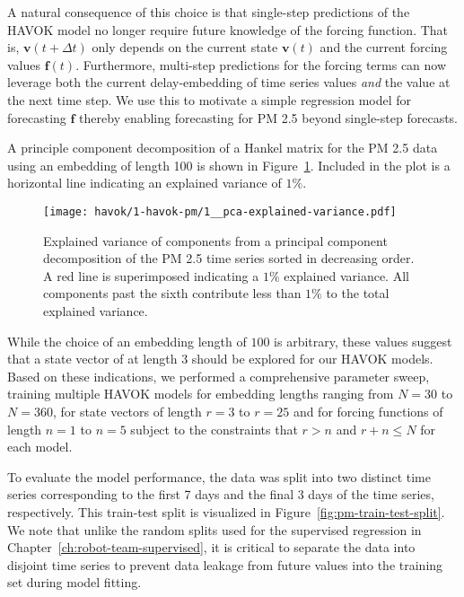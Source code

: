 A natural consequence of this choice is that single-step predictions of the
HAVOK model no longer require future knowledge of the forcing function. That is,
$\mathbf{v}(t+\Delta t)$ only depends on the current state $\mathbf{v}(t)$ and
the current forcing values $\mathbf{f}(t)$. Furthermore, multi-step
predictions for the forcing terms can now leverage both the current delay-embedding of
time series values \textit{and} the value at the next time step. We use this to
motivate a simple regression model for forecasting $\mathbf{f}$ thereby enabling
forecasting for PM 2.5 beyond single-step forecasts.

A principle component decomposition of a Hankel matrix for the PM 2.5 data 
using an embedding of length 100 is shown in Figure~\ref{fig:pm-timeseries-pca}.
Included in the plot is a horizontal line indicating an explained variance of
$1\%$.

\begin{figure}[h]
  \centering
  \texttt{[image: havok/1-havok-pm/1\_\_pca-explained-variance.pdf]}
  \caption{Explained variance of components from a principal component
    decomposition of the PM 2.5 time series sorted in decreasing order. A red
    line is superimposed indicating a $1\%$ explained variance. All components
    past the sixth contribute less than $1\%$ to the total explained variance. }
  \label{fig:pm-timeseries-pca}
\end{figure}

While the choice of an embedding length of $100$ is arbitrary, these values
suggest that a state vector of at length $3$ should be explored for our HAVOK
models. Based on these indications, we performed a comprehensive parameter sweep,
training multiple HAVOK models for embedding lengths ranging from $N=30$ to
$N=360$, for state vectors of length $r=3$ to $r=25$ and for forcing functions
of length $n=1$ to $n=5$ subject to the constraints that $r>n$ and $r+n \leq N$
for each model.

To evaluate the model performance, the data was split into two distinct time
series corresponding to the first 7 days and the final 3 days of the time
series, respectively. This train-test split is visualized in
Figure~\ref{fig:pm-train-test-split}. We note that unlike the random splits used
for the supervised regression in Chapter~\ref{ch:robot-team-supervised}, it is
critical to separate the data into  disjoint time series to prevent data leakage
from future values into the training set during model fitting.

